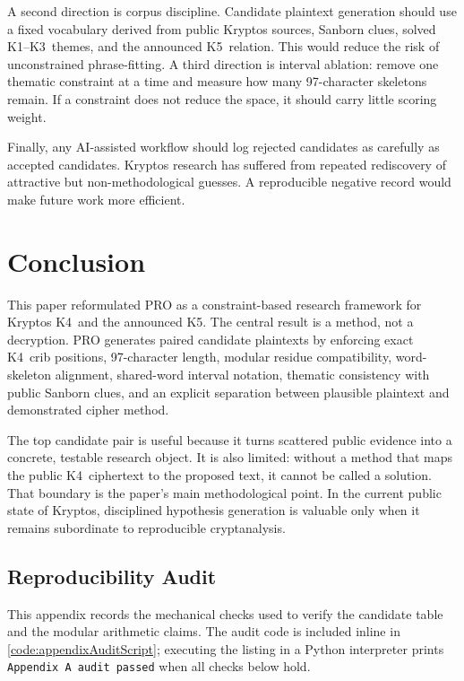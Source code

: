 \documentclass[12pt]{paperFormatting}
\newcommand{\Kfour}{K4}
\newcommand{\Kfive}{K5}
\newcommand{\Kone}{K1}
\newcommand{\Kthree}{K3}
\begin{document}
\begin{thesisbody}
A second direction is corpus discipline. Candidate plaintext generation should use a fixed vocabulary derived from public Kryptos sources, Sanborn clues, solved \Kone--\Kthree\ themes, and the announced \Kfive\ relation. This would reduce the risk of unconstrained phrase-fitting. A third direction is interval ablation: remove one thematic constraint at a time and measure how many 97-character skeletons remain. If a constraint does not reduce the space, it should carry little scoring weight.

Finally, any AI-assisted workflow should log rejected candidates as carefully as accepted candidates. Kryptos research has suffered from repeated rediscovery of attractive but non-methodological guesses. A reproducible negative record would make future work more efficient.

\section{Conclusion}
This paper reformulated PRO as a constraint-based research framework for Kryptos \Kfour\ and the announced \Kfive. The central result is a method, not a decryption. PRO generates paired candidate plaintexts by enforcing exact \Kfour\ crib positions, 97-character length, modular residue compatibility, word-skeleton alignment, shared-word interval notation, thematic consistency with public Sanborn clues, and an explicit separation between plausible plaintext and demonstrated cipher method.

The top candidate pair is useful because it turns scattered public evidence into a concrete, testable research object. It is also limited: without a method that maps the public \Kfour\ ciphertext to the proposed text, it cannot be called a solution. That boundary is the paper's main methodological point. In the current public state of Kryptos, disciplined hypothesis generation is valuable only when it remains subordinate to reproducible cryptanalysis.

\begin{theappendices}
\setcounter{section}{0}
\renewcommand{\thesection}{Appendix \Alph{section}}
\section{Reproducibility Audit}
This appendix records the mechanical checks used to verify the candidate table and the modular arithmetic claims. The audit code is included inline in \autoref{code:appendixAuditScript}; executing the listing in a Python interpreter prints \texttt{Appendix A audit passed} when all checks below hold.


\end{theappendices}
\end{thesisbody}
\end{document}
